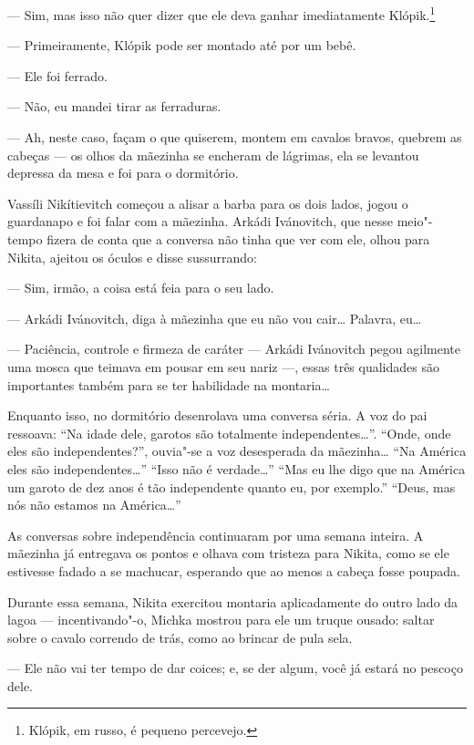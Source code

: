 --- Sim, mas isso não quer dizer que ele deva ganhar imediatamente
Klópik.\footnote{Klópik, em russo, é pequeno percevejo.}

--- Primeiramente, Klópik pode ser montado até por um bebê.

--- Ele foi ferrado.

--- Não, eu mandei tirar as ferraduras.

--- Ah, neste caso, façam o que quiserem, montem em cavalos bravos,
quebrem as cabeças --- os olhos da mãezinha se encheram de lágrimas, ela
se levantou depressa da mesa e foi para o dormitório.

Vassíli Nikítievitch começou a alisar a barba para os dois lados, jogou o
guardanapo e foi falar com a mãezinha. Arkádi Ivánovitch, que nesse
meio"-tempo fizera de conta que a conversa não tinha que ver com ele,
olhou para Nikita, ajeitou os óculos e disse sussurrando:

--- Sim, irmão, a coisa está feia para o seu lado.

--- Arkádi Ivánovitch, diga à mãezinha que eu não vou cair\ldots{} Palavra,
eu\ldots{}

--- Paciência, controle e firmeza de caráter --- Arkádi Ivánovitch pegou
agilmente uma mosca que teimava em pousar em seu nariz ---, essas três
qualidades são importantes também para se ter habilidade na montaria\ldots{}

Enquanto isso, no dormitório desenrolava uma conversa séria. A voz do
pai ressoava: ``Na idade dele, garotos são totalmente independentes\ldots{}''.
``Onde, onde eles são independentes?'', ouvia"-se a voz desesperada da
mãezinha\ldots{} ``Na América eles são independentes\ldots{}'' ``Isso não é
verdade\ldots{}'' ``Mas eu lhe digo que na América um garoto de dez anos é
tão independente quanto eu, por exemplo.'' ``Deus, mas nós não estamos na
América\ldots{}''

As conversas sobre independência continuaram por uma semana inteira. A
mãezinha já entregava os pontos e olhava com tristeza para Nikita, como
se ele estivesse fadado a se machucar, esperando que ao menos a cabeça
fosse poupada.

Durante essa semana, Nikita exercitou montaria aplicadamente do outro
lado da lagoa --- incentivando"-o, Michka mostrou para ele um truque
ousado: saltar sobre o cavalo correndo de trás, como ao brincar de pula
sela.

--- Ele não vai ter tempo de dar coices; e, se der algum, você já estará
no pescoço dele.

